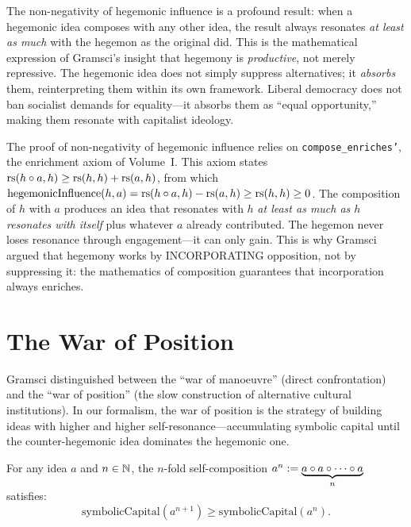 \begin{interpretation}
The non-negativity of hegemonic influence is a profound result: when a hegemonic
idea composes with any other idea, the result always resonates \emph{at least as
much} with the hegemon as the original did. This is the mathematical expression
of Gramsci's insight that hegemony is \emph{productive}, not merely repressive.
The hegemonic idea does not simply suppress alternatives; it \emph{absorbs} them,
reinterpreting them within its own framework. Liberal democracy does not ban
socialist demands for equality---it absorbs them as ``equal opportunity,''
making them resonate with capitalist ideology.
\end{interpretation}

\begin{remark}
The proof of non-negativity of hegemonic influence relies on
\texttt{compose\_enriches'}, the enrichment axiom of Volume~I. This axiom
states $\mathrm{rs}(h \circ a, h) \geq \mathrm{rs}(h,h) + \mathrm{rs}(a,h)$, from which
$\mathrm{hegemonicInfluence}(h,a) = \mathrm{rs}(h \circ a, h) - \mathrm{rs}(a,h)
\geq \mathrm{rs}(h,h) \geq 0$. The composition of $h$ with $a$ produces an idea
that resonates with $h$ \emph{at least as much as $h$ resonates with itself}
plus whatever $a$ already contributed. The hegemon never loses resonance
through engagement---it can only gain. This is why Gramsci argued that
hegemony works by INCORPORATING opposition, not by suppressing it: the
mathematics of composition guarantees that incorporation always enriches.
\end{remark}

\section{The War of Position}

Gramsci distinguished between the ``war of manoeuvre'' (direct confrontation)
and the ``war of position'' (the slow construction of alternative cultural
institutions). In our formalism, the war of position is the strategy of building
ideas with higher and higher self-resonance---accumulating symbolic capital
until the counter-hegemonic idea dominates the hegemonic one.

\begin{theorem}
\label{thm:capital-accumulation}
For any idea $a$ and $n \in \mathbb{N}$, the $n$-fold self-composition
$a^n := \underbrace{a \circ a \circ \cdots \circ a}_{n}$ satisfies:
\[
  \mathrm{symbolicCapital}(a^{n+1}) \geq \mathrm{symbolicCapital}(a^n).
\]
\end{theorem}

